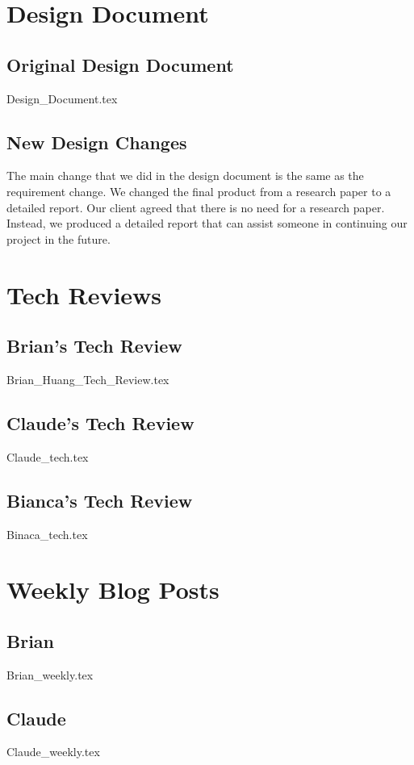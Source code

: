 \documentclass[onecolumn, draftclsnofoot,10pt, compsoc]{IEEEtran}
\begin{document}
	\section{Design Document}
	
	\subsection{Original Design Document}
	{Design_Document.tex}
	\subsection{New Design Changes}
		The main change that we did in the design document is the same as the requirement change. We changed the final product from a research paper to a detailed report. Our client agreed that there is no need for a research paper. Instead, we produced a detailed report that can assist someone in continuing our project in the future. 
	
	\section{Tech Reviews}
	\subsection{Brian's Tech Review}
	{Brian_Huang_Tech_Review.tex}
	\subsection{Claude's Tech Review}
	{Claude_tech.tex}
	\subsection{Bianca's Tech Review}
	{Binaca_tech.tex}
	
	\section{Weekly Blog Posts}
	
	\subsection{Brian}
	{Brian_weekly.tex}
	
	\subsection{Claude}
	{Claude_weekly.tex}
	
\end{document}
